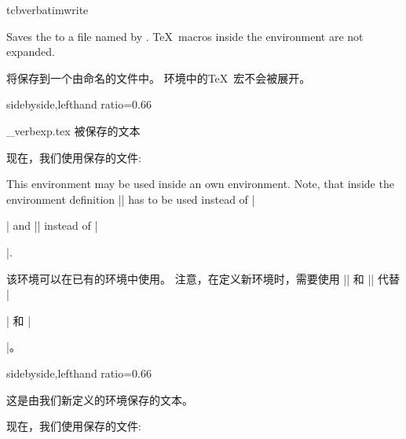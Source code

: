 \begin{docEnvironment}{tcbverbatimwrite}{}

Saves the  to a file named by .
\TeX\ macros inside the environment are not expanded.

将保存到一个由命名的文件中。%
环境中的\TeX\ 宏不会被展开。


\begin{dispExample*}{sidebyside,lefthand ratio=0.66}
\begin{tcbverbatimwrite}{\jobname_verbexp.tex}
被保存的文本
\end{tcbverbatimwrite}

现在，我们使用保存的文件:\par

\end{dispExample*}

This environment may be used inside an own environment. Note, that inside
the environment definition |\tcbverbatimwrite| has to be used instead of
|\begin{tcbverbatimwrite}| and |\endtcbverbatimwrite| instead of |\end{tcbverbatimwrite}|.

该环境可以在已有的环境中使用。%
注意，在定义新环境时，需要使用 |\tcbverbatimwrite| 和 |\endtcbverbatimwrite| 代替 |\begin{tcbverbatimwrite}| 和 |\end{tcbverbatimwrite}|。

\begin{dispExample*}{sidebyside,lefthand ratio=0.66}
\newenvironment{myverbatim}{%
\begingroup{}}%
{\endtcbverbatimwrite\endgroup}

\begin{myverbatim}
这是由我们新定义的环境保存的文本。
\end{myverbatim}

现在，我们使用保存的文件:\par

\end{dispExample*}
\end{docEnvironment}

